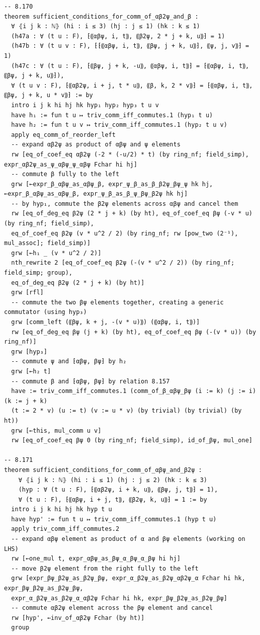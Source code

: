 \documentclass[10pt,a4paper]{article}
\begin{document}
\begin{Verbatim}
-- 8.170
theorem sufficient_conditions_for_comm_of_αβ2ψ_and_β :
  ∀ ⦃i j k : ℕ⦄ (hi : i ≤ 3) (hj : j ≤ 1) (hk : k ≤ 1)
  (h47a : ∀ (t u : F), ⁅⸨αβψ, i, t⸩, ⸨β2ψ, 2 * j + k, u⸩⁆ = 1)
  (h47b : ∀ (t u v : F), ⁅⁅⸨αβψ, i, t⸩, ⸨βψ, j + k, u⸩⁆, ⸨ψ, j, v⸩⁆ = 1)
  (h47c : ∀ (t u : F), ⁅⸨βψ, j + k, -u⸩, ⸨αβψ, i, t⸩⁆ = ⁅⸨αβψ, i, t⸩, ⸨βψ, j + k, u⸩⁆),
  ∀ (t u v : F), ⁅⸨αβ2ψ, i + j, t * u⸩, ⸨β, k, 2 * v⸩⁆ = ⁅⸨αβψ, i, t⸩, ⸨βψ, j + k, u * v⸩⁆ := by
  intro i j k hi hj hk hyp₁ hyp₂ hyp₃ t u v
  have h₁ := fun t u ↦ triv_comm_iff_commutes.1 (hyp₁ t u)
  have h₂ := fun t u v ↦ triv_comm_iff_commutes.1 (hyp₂ t u v)
  apply eq_comm_of_reorder_left
  -- expand αβ2ψ as product of αβψ and ψ elements
  rw [eq_of_coef_eq αβ2ψ (-2 * (-u/2) * t) (by ring_nf; field_simp), expr_αβ2ψ_as_ψ_αβψ_ψ_αβψ Fchar hi hj]
  -- commute β fully to the left
  grw [←expr_β_αβψ_as_αβψ_β, expr_ψ_β_as_β_β2ψ_βψ_ψ hk hj, ←expr_β_αβψ_as_αβψ_β, expr_ψ_β_as_β_ψ_βψ_β2ψ hk hj]
  -- by hyp₁, commute the β2ψ elements across αβψ and cancel them
  rw [eq_of_deg_eq β2ψ (2 * j + k) (by ht), eq_of_coef_eq βψ (-v * u) (by ring_nf; field_simp),
  eq_of_coef_eq β2ψ (v * u^2 / 2) (by ring_nf; rw [pow_two (2⁻¹), mul_assoc]; field_simp)]
  grw [←h₁ _ (v * u^2 / 2)]
  nth_rewrite 2 [eq_of_coef_eq β2ψ (-(v * u^2 / 2)) (by ring_nf; field_simp; group),
  eq_of_deg_eq β2ψ (2 * j + k) (by ht)]
  grw [rfl]
  -- commute the two βψ elements together, creating a generic commutator (using hyp₃)
  grw [comm_left (⸨βψ, k + j, -(v * u)⸩) (⸨αβψ, i, t⸩)]
  rw [eq_of_deg_eq βψ (j + k) (by ht), eq_of_coef_eq βψ (-(v * u)) (by ring_nf)]
  grw [hyp₃]
  -- commute ψ and ⁅αβψ, βψ⁆ by h₂
  grw [←h₂ t]
  -- commute β and ⁅αβψ, βψ⁆ by relation 8.157
  have := triv_comm_iff_commutes.1 (comm_of_β_αβψ_βψ (i := k) (j := i) (k := j + k)
  (t := 2 * v) (u := t) (v := u * v) (by trivial) (by trivial) (by ht))
  grw [←this, mul_comm u v]
  rw [eq_of_coef_eq βψ 0 (by ring_nf; field_simp), id_of_βψ, mul_one]

-- 8.171
theorem sufficient_conditions_for_comm_of_αβψ_and_β2ψ :
    ∀ ⦃i j k : ℕ⦄ (hi : i ≤ 1) (hj : j ≤ 2) (hk : k ≤ 3)
    (hyp : ∀ (t u : F), ⁅⸨αβ2ψ, i + k, u⸩, ⸨βψ, j, t⸩⁆ = 1),
    ∀ (t u : F), ⁅⸨αβψ, i + j, t⸩, ⸨β2ψ, k, u⸩⁆ = 1 := by
  intro i j k hi hj hk hyp t u
  have hyp' := fun t u ↦ triv_comm_iff_commutes.1 (hyp t u)
  apply triv_comm_iff_commutes.2
  -- expand αβψ element as product of α and βψ elements (working on LHS)
  rw [←one_mul t, expr_αβψ_as_βψ_α_βψ_α_βψ hi hj]
  -- move β2ψ element from the right fully to the left
  grw [expr_βψ_β2ψ_as_β2ψ_βψ, expr_α_β2ψ_as_β2ψ_αβ2ψ_α Fchar hi hk, expr_βψ_β2ψ_as_β2ψ_βψ,
  expr_α_β2ψ_as_β2ψ_α_αβ2ψ Fchar hi hk, expr_βψ_β2ψ_as_β2ψ_βψ]
  -- commute αβ2ψ element across the βψ element and cancel
  rw [hyp', ←inv_of_αβ2ψ Fchar (by ht)]
  group


\end{Verbatim}
\end{document}
